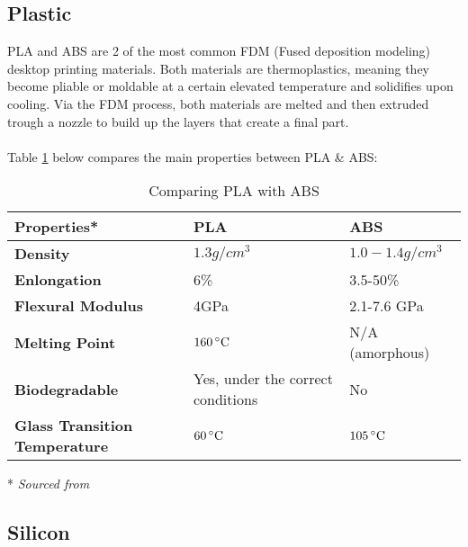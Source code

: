\documentclass[a4paper]{article}
\begin{document}
\subsection{Plastic}
PLA and ABS are 2 of the most common FDM (Fused deposition modeling) desktop printing materials.
Both materials are thermoplastics, meaning they become pliable or moldable at a certain elevated temperature and solidifies upon cooling.
Via the FDM process, both materials are melted and then extruded trough a nozzle to build up the layers that create a final part.
\\ \\
Table \ref{tab:pla-abs} below compares the main properties between PLA \& ABS:
\begin{table}[ht]
    \centering
    \begin{threeparttable}
        \begin{tabular}[t]{>{\bfseries}l l l}
            \toprule
            Properties* & \textbf{PLA} & \textbf{ABS} \\
            \midrule
            Density & $1.3 g/cm^3$ & $1.0 - 1.4 g/cm^3$ \\
            Enlongation & 6\% & 3.5-50\% \\ %
            Flexural Modulus & 4GPa & 2.1-7.6 GPa \\ %
            Melting Point & $160\,^{\circ}{\rm C}$ & N/A (amorphous) \\
            Biodegradable & Yes, under the correct conditions & No \\
            Glass Transition Temperature & $60\,^{\circ}{\rm C}$ & $105\,^{\circ}{\rm C}$ \\ %
            \bottomrule
        \end{tabular}
        \caption{Comparing PLA with ABS}
        \label{tab:pla-abs}
        \begin{tablenotes}
            \item[*] \textit{Sourced from \cite{MakeItFrom}}
        \end{tablenotes}    
    \end{threeparttable}    
\end{table}

\subsection{Silicon}

\newpage


\end{document}
